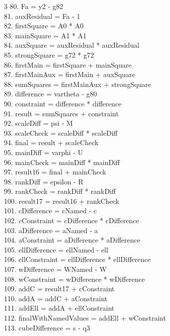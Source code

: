 \documentclass[10pt]{article}
\begin{document}
\begin{multicols}{3}
80. Fa = y2 - g82\\
81. auxResidual = Fa - 1\\
82. firstSquare = A0 * A0\\
83. mainSquare = A1 * A1\\
84. auxSquare = auxResidual * auxResidual\\
85. strongSquare = g72 * g72\\
86. firstMain = firstSquare + mainSquare\\
87. firstMainAux = firstMain + auxSquare\\
88. sumSquares = firstMainAux + strongSquare\\
89. difference = vartheta - g80\\
90. constraint = difference * difference\\
91. result = sumSquares + constraint\\
92. scaleDiff = psi - M\\
93. scaleCheck = scaleDiff * scaleDiff\\
94. final = result + scaleCheck\\
95. mainDiff = varphi - U\\
96. mainCheck = mainDiff * mainDiff\\
97. result16 = final + mainCheck\\
98. rankDiff = epsilon - R\\
99. rankCheck = rankDiff * rankDiff\\
100. result17 = result16 + rankCheck\\
101. cDifference = cNamed - c\\
102. cConstraint = cDifference * cDifference\\
103. aDifference = aNamed - a\\
104. aConstraint = aDifference * aDifference\\
105. ellDifference = ellNamed - ell\\
106. ellConstraint = ellDifference * ellDifference\\
107. wDifference = WNamed - W\\
108. wConstraint = wDifference * wDifference\\
109. addC = result17 + cConstraint\\
110. addA = addC + aConstraint\\
111. addEll = addA + ellConstraint\\
112. finalWithNamedValues = addEll + wConstraint\\
113. cubeDifference = s - q3\\

\end{multicols}
\end{document}
